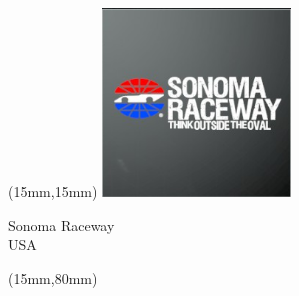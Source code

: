 \begin{textblock*}{50mm}(15mm,15mm)%
\includegraphics[width=50mm]{LG/2015-05-20_00096.png}
\par Sonoma Raceway\\ USA
\end{textblock*}
\begin{textblock*}{185mm}(15mm,80mm)%
\end{textblock*}
